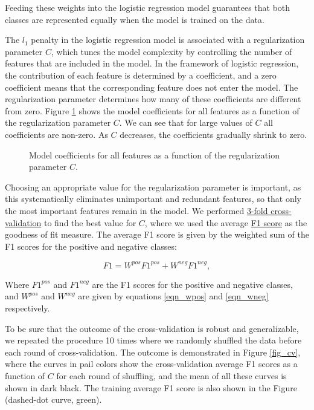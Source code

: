 \documentclass[10pt,parskip=half,
toc=sectionentrywithdots,
bibliography=totocnumbered,
captions=tableheading,numbers=noendperiod]{scrartcl}
\begin{document}
Feeding these weights into the logistic regression model guarantees that
both classes are represented equally when the model is trained on the
data.

The \(l_1\) penalty in the logistic regression model is associated with
a regularization parameter \(C\), which tunes the model complexity by
controlling the number of features that are included in the model. In
the framework of logistic regression, the contribution of each feature
is determined by a coefficient, and a zero coefficient means that the
corresponding feature does not enter the model. The regularization
parameter determines how many of these coefficients are different from
zero. Figure \ref{fig_l1} shows the model coefficients for all features
as a function of the regularization parameter \(C\). We can see that for
large values of \(C\) all coefficients are non-zero. As \(C\) decreases,
the coefficients gradually shrink to zero.

\begin{figure}[H]\begin{center}\end{center}\caption{Model coefficients for all features as a function of the regularization
parameter \(C\).}\label{fig_l1}\end{figure}

Choosing an appropriate value for the regularization parameter is
important, as this systematically eliminates unimportant and redundant
features, so that only the most important features remain in the model.
We performed
\href{https://towardsdatascience.com/why-and-how-to-cross-validate-a-model-d6424b45261f}{3-fold
cross-validation} to find the best value for \(C\), where we used the
average \href{https://en.wikipedia.org/wiki/F1_score}{F1 score} as the
goodness of fit measure. The average F1 score is given by the weighted
sum of the F1 scores for the positive and negative classes:

\begin{equation}\label{eqn_F}
F1=W^{pos}F1^{pos}+W^{neg}F1^{neg},
\end{equation}

Where \(F1^{pos}\) and \(F1^{neg}\) are the F1 scores for the positive
and negative classes, and \(W^{pos}\) and \(W^{neg}\) are given by
equations \ref{eqn_wpos} and \ref{eqn_wneg} respectively.

To be sure that the outcome of the cross-validation is robust and
generalizable, we repeated the procedure 10 times where we randomly
shuffled the data before each round of cross-validation. The outcome is
demonstrated in Figure \ref{fig_cv}, where the curves in pail colors
show the cross-validation average F1 scores as a function of \(C\) for
each round of shuffling, and the mean of all these curves is shown in
dark black. The training average F1 score is also shown in the Figure
(dashed-dot curve, green).
\end{document}
